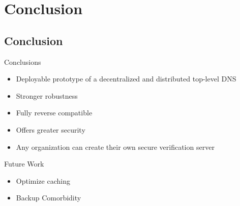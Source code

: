 \documentclass[11pt]{beamer}
\begin{document}
\section{Conclusion}



\subsection{Conclusion}
\begin{frame}{Conclusions}
	\begin{itemize}
		\item Deployable prototype of a decentralized and distributed top-level DNS
		\item Stronger robustness
		\item Fully reverse compatible
		\item Offers greater security
		\item Any organization can create their own secure verification server
		
	\end{itemize}
\end{frame}


\begin{frame}{Future Work}
	\begin{itemize}
		\item Optimize caching
		\item Backup Comorbidity 
	\end{itemize}
\end{frame}



%
\end{document}
